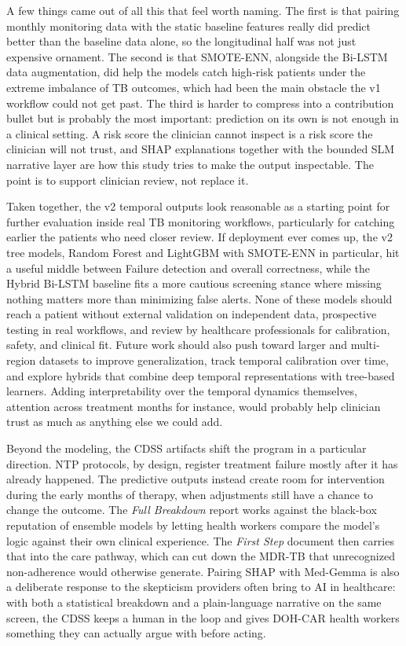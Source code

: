 \documentclass[12pt]{article}
\renewcommand{\_}{\textunderscore\allowbreak}
\begin{document}
A few things came out of all this that feel worth naming. The first is that pairing monthly monitoring data with the static baseline features really did predict better than the baseline data alone, so the longitudinal half was not just expensive ornament. The second is that SMOTE-ENN, alongside the Bi-LSTM data augmentation, did help the models catch high-risk patients under the extreme imbalance of TB outcomes, which had been the main obstacle the v1 workflow could not get past. The third is harder to compress into a contribution bullet but is probably the most important: prediction on its own is not enough in a clinical setting. A risk score the clinician cannot inspect is a risk score the clinician will not trust, and SHAP explanations together with the bounded SLM narrative layer are how this study tries to make the output inspectable. The point is to support clinician review, not replace it.

Taken together, the v2 temporal outputs look reasonable as a starting point for further evaluation inside real TB monitoring workflows, particularly for catching earlier the patients who need closer review. If deployment ever comes up, the v2 tree models, Random Forest and LightGBM with SMOTE-ENN in particular, hit a useful middle between Failure detection and overall correctness, while the Hybrid Bi-LSTM baseline fits a more cautious screening stance where missing nothing matters more than minimizing false alerts. None of these models should reach a patient without external validation on independent data, prospective testing in real workflows, and review by healthcare professionals for calibration, safety, and clinical fit. Future work should also push toward larger and multi-region datasets to improve generalization, track temporal calibration over time, and explore hybrids that combine deep temporal representations with tree-based learners. Adding interpretability over the temporal dynamics themselves, attention across treatment months for instance, would probably help clinician trust as much as anything else we could add.

Beyond the modeling, the CDSS artifacts shift the program in a particular direction. NTP protocols, by design, register treatment failure mostly after it has already happened. The predictive outputs instead create room for intervention during the early months of therapy, when adjustments still have a chance to change the outcome. The \textit{Full Breakdown} report works against the black-box reputation of ensemble models by letting health workers compare the model's logic against their own clinical experience. The \textit{First Step} document then carries that into the care pathway, which can cut down the MDR-TB that unrecognized non-adherence would otherwise generate. Pairing SHAP with Med-Gemma is also a deliberate response to the skepticism providers often bring to AI in healthcare: with both a statistical breakdown and a plain-language narrative on the same screen, the CDSS keeps a human in the loop and gives DOH-CAR health workers something they can actually argue with before acting.
\end{document}
